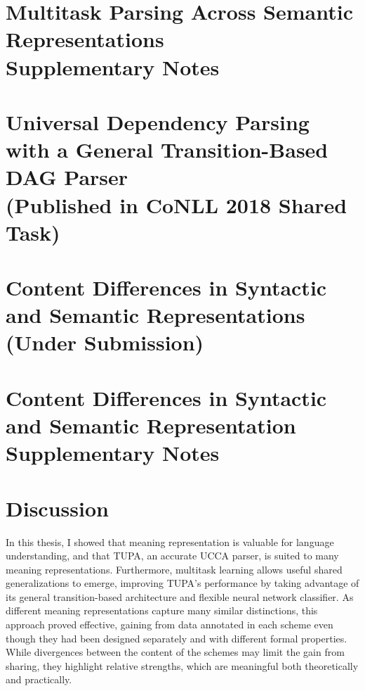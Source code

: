 \documentclass[12pt,a4paper]{report}
\begin{document}


\chapter*{Multitask Parsing Across Semantic Representations \\ Supplementary Notes}



\chapter{Universal Dependency Parsing with a General Transition-Based DAG Parser \\ (Published in CoNLL 2018 Shared Task)}



\chapter{Content Differences in Syntactic and Semantic Representations \\ (Under Submission)}



\chapter*{Content Differences in Syntactic and Semantic Representation \\ Supplementary Notes}






\chapter{Discussion}

In this thesis, I showed that meaning representation is valuable for language understanding,
and that TUPA, an accurate UCCA parser, is suited to many meaning representations.
Furthermore, multitask learning allows useful shared generalizations to emerge,
improving TUPA's performance by taking advantage of its general transition-based
architecture and flexible neural network classifier.
As different meaning representations capture many similar distinctions,
this approach proved effective, gaining from data annotated in each scheme
even though they had been designed separately and with different formal properties.
While divergences between the content of the schemes may limit the gain from sharing,
they highlight relative strengths, which are meaningful both theoretically and practically.
\end{document}
